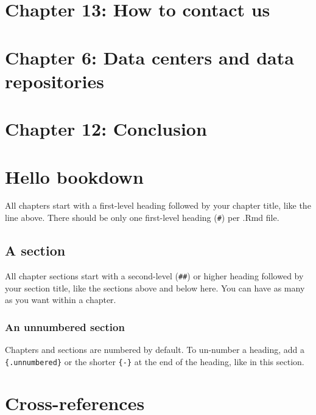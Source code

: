 \documentclass[
]{book}
\theoremstyle{definition}
\theoremstyle{definition}
\theoremstyle{definition}
\theoremstyle{definition}
\theoremstyle{remark}
\begin{document}
\hypertarget{chapter-13-how-to-contact-us}{%
\chapter{Chapter 13: How to contact us}\label{chapter-13-how-to-contact-us}}

\hypertarget{chapter-6-data-centers-and-data-repositories-1}{%
\chapter{Chapter 6: Data centers and data repositories}\label{chapter-6-data-centers-and-data-repositories-1}}

\hypertarget{chapter-12-conclusion-1}{%
\chapter{Chapter 12: Conclusion}\label{chapter-12-conclusion-1}}

\hypertarget{hello-bookdown}{%
\chapter{Hello bookdown}\label{hello-bookdown}}

All chapters start with a first-level heading followed by your chapter title, like the line above. There should be only one first-level heading (\texttt{\#}) per .Rmd file.

\hypertarget{a-section}{%
\section{A section}\label{a-section}}

All chapter sections start with a second-level (\texttt{\#\#}) or higher heading followed by your section title, like the sections above and below here. You can have as many as you want within a chapter.

\hypertarget{an-unnumbered-section}{%
\subsection*{An unnumbered section}\label{an-unnumbered-section}}

Chapters and sections are numbered by default. To un-number a heading, add a \texttt{\{.unnumbered\}} or the shorter \texttt{\{-\}} at the end of the heading, like in this section.

\hypertarget{cross}{%
\chapter{Cross-references}\label{cross}}
\end{document}
